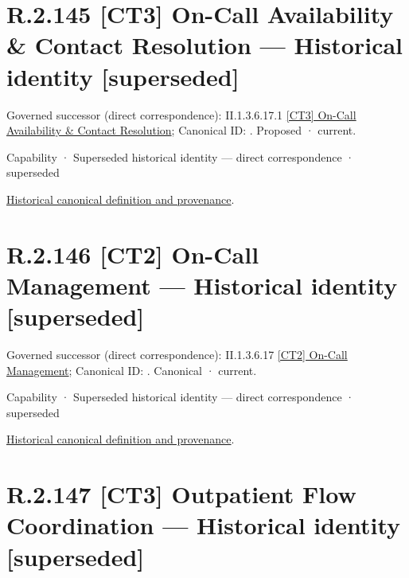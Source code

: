 \section*{R.2.145 [CT3] On-Call Availability \& Contact Resolution — Historical identity [superseded]}
\label{navigation:R.2.145}

{\small Governed successor (direct correspondence): II.1.3.6.17.1 \hyperref[element:677a816c42414ea694791b4ee5a14285]{[CT3] On-Call Availability \& Contact Resolution}; Canonical ID: \texttt{}. Proposed · current.}\par
\label{element:a03075a46f75497f8c6ba95d9c9e27c4}
{\small Capability · Superseded historical identity — direct correspondence · superseded}\par
\href{../../../../continuum/strategy/capability/a03075a46f75497f8c6ba95d9c9e27c4.md}{Historical canonical definition and provenance}.\par
\section*{R.2.146 [CT2] On-Call Management — Historical identity [superseded]}
\label{navigation:R.2.146}

{\small Governed successor (direct correspondence): II.1.3.6.17 \hyperref[element:b16cef8f2bfd4b92948ec75cbcfa7b9a]{[CT2] On-Call Management}; Canonical ID: \texttt{}. Canonical · current.}\par
\label{element:c8e6e66e8718493c9093f37d129f9ff2}
{\small Capability · Superseded historical identity — direct correspondence · superseded}\par
\href{../../../../continuum/strategy/capability/c8e6e66e8718493c9093f37d129f9ff2.md}{Historical canonical definition and provenance}.\par
\section*{R.2.147 [CT3] Outpatient Flow Coordination — Historical identity [superseded]}
\label{navigation:R.2.147}

